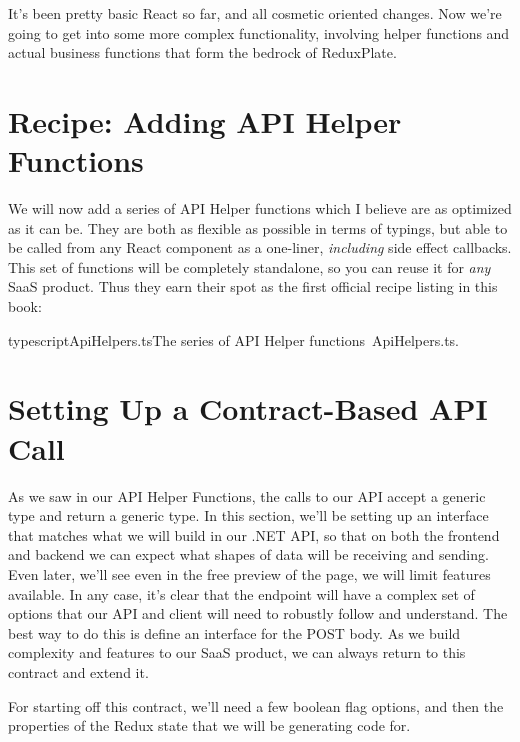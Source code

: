 \documentclass[paper=6in:9in,pagesize=pdftex,headinclude=on,footinclude=on,12pt]{scrbook}
\begin{document}
It's been pretty basic React so far, and all cosmetic oriented changes. Now we're going to get into some more complex functionality, involving helper functions and actual business functions that form the bedrock of ReduxPlate.

\section{Recipe: Adding API Helper Functions}

We will now add a series of API Helper functions which I believe are as optimized as it can be. They are both as flexible as possible in terms of typings, but able to be called from any React component as a one-liner, \textit{including} side effect callbacks. This set of functions will be completely standalone, so you can reuse it for \textit{any} SaaS product. Thus they earn their spot as the first official recipe listing in this book:

\begin{codeInput}{typescript}{ApiHelpers.ts}{The series of API Helper functions\, ApiHelpers.ts.}

\end{codeInput}

\section{Setting Up a Contract-Based API Call}

As we saw in our API Helper Functions, the calls to our API accept a generic type and return a generic type. In this section, we'll be setting up an interface that matches what we will build in our .NET API, so that on both the frontend and backend we can expect what shapes of data will be receiving and sending. Even later, we'll see even in the free preview of the  page, we will limit features available. In any case, it's clear that the  endpoint will have a complex set of options that our API and client will need to robustly follow and understand. The best way to do this is define an interface for the POST body. As we build complexity and features to our SaaS product, we can always return to this contract and extend it.

For starting off this contract, we'll need a few boolean flag options, and then the properties of the Redux state that we will be generating code for.

\end{document}
